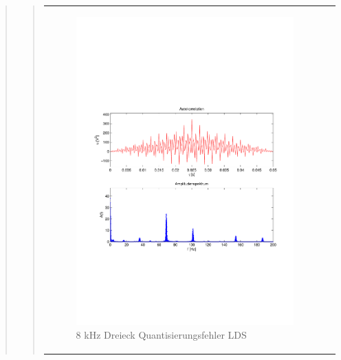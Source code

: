 \begin{quote}
\begin{quote}
\begin{center}
\begin{tabular}{ll}
            \hspace{-4cm}
                \begin{minipage}{0.6\textwidth}
                    \begin{figure}[H]
                        \includegraphics[scale=0.5, trim = 16mm 70mm 16mm 85mm, clip]
                                        {Bilder/8kHz_dreieck_LSD}
                        \caption{8 kHz Dreieck Quantisierungsfehler LDS}
                        \label{fig:8kHz_drei_LDS}
                    \end{figure}
                \end{minipage}
                

\end{tabular}
\end{center}
\end{quote}
\end{quote}
